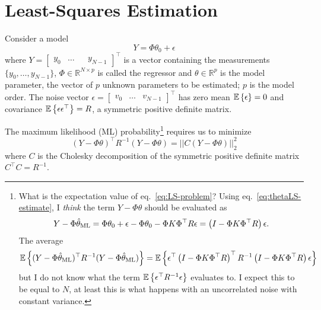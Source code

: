 \chapter{Least-Squares Estimation}
\label{chap:LS-estimation}

Consider a model
\begin{equation}
  \label{eq:LTI-with-noise}
  Y = \Phi\theta_0 + \epsilon
\end{equation}
where $Y = \begin{bmatrix}
  y_0 & \ldots && y_{N-1}
\end{bmatrix}^\top$ is a vector containing the measurements $\{y_0,\ldots, y_{N-1}\}$, $\Phi\in \mathbb{R}^{N\times p}$ is called the regressor and $\theta\in\mathbb{R}^p$ is the model parameter, the vector of $p$ unknown parameters to be estimated; $p$ is the model order.
The noise vector $\epsilon =
\begin{bmatrix}
  v_0 & \ldots & v_{N-1}
\end{bmatrix}^\top$ has zero mean $\mathbb{E}\left\{\epsilon\right\}=0$ and covariance $\mathbb{E}\left\{\epsilon \epsilon^\top\right\}=R$, a symmetric positive definite matrix.

The maximum likelihood (ML) probability\footnote{What is the expectation value of eq.~\eqref{eq:LS-problem}? Using eq.~\eqref{eq:thetaLS-estimate}, I \emph{think} the term $Y-\Phi\theta$ should be evaluated as
  \begin{equation*}
    Y-\Phi\hat{\theta}_\textrm{ML} = \Phi\theta_0 + \epsilon - \Phi\theta_0 - \Phi K \Phi^\top R\epsilon = \left(I - \Phi K \Phi^\top R\right)\epsilon.
  \end{equation*}
  The average
  \begin{equation*}
    \mathbb{E}\left\{(Y - \Phi \hat{\theta}_\textrm{ML})^\top R^{-1} (Y - \Phi \hat{\theta}_\textrm{ML})\right\} = \mathbb{E}\left\{\epsilon^\top\left(I - \Phi K \Phi^\top R\right)^\top R^{-1}\left(I - \Phi K \Phi^\top R\right)\epsilon\right\}
  \end{equation*}
  but I do not know what the term $\mathbb{E}\left\{\epsilon^\top R^{-1}\epsilon\right\}$ evaluates to. I expect this to be equal to $N$, at least this is what happens with an uncorrelated noise with constant variance.} requires us to minimize
\begin{equation}
  \label{eq:LS-problem}
  (Y - \Phi \theta)^\top R^{-1} (Y - \Phi \theta) = ||C (Y - \Phi \theta)||_2^2
\end{equation}
where $C$ is the Cholesky decomposition of the symmetric positive definite matrix $C^\top C = R^{-1}$.

